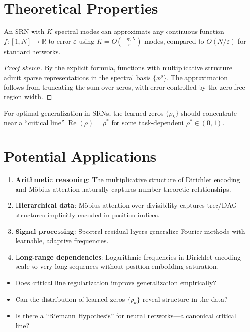 \section{Theoretical Properties}

\begin{theorem}
  An SRN with $K$ spectral modes can approximate any continuous function $f: [1, N] \to \mathbb{R}$ to error $\varepsilon$ using $K = O\left(\frac{\log N}{\varepsilon}\right)$ modes, compared to $O(N/\varepsilon)$ for standard networks.
\end{theorem}

\begin{proof}[Proof sketch]
  By the explicit formula, functions with multiplicative structure admit sparse representations in the spectral basis $\{x^\rho\}$. The approximation follows from truncating the sum over zeros, with error controlled by the zero-free region width.
\end{proof}

\begin{conjecture}
  For optimal generalization in SRNs, the learned zeros $\{\rho_k\}$ should concentrate near a ``critical line'' $\operatorname{Re}(\rho) = \rho^*$ for some task-dependent $\rho^* \in (0, 1)$.
\end{conjecture}

\section{Potential Applications}

\begin{enumerate}
  \item \textbf{Arithmetic reasoning}: The multiplicative structure of Dirichlet encoding and M\"obius attention naturally captures number-theoretic relationships.

  \item \textbf{Hierarchical data}: M\"obius attention over divisibility captures tree/DAG structures implicitly encoded in position indices.

  \item \textbf{Signal processing}: Spectral residual layers generalize Fourier methods with learnable, adaptive frequencies.

  \item \textbf{Long-range dependencies}: Logarithmic frequencies in Dirichlet encoding scale to very long sequences without position embedding saturation.
\end{enumerate}

\begin{remark}
  \begin{itemize}
    \item Does critical line regularization improve generalization empirically?
    \item Can the distribution of learned zeros $\{\rho_k\}$ reveal structure in the data?
    \item Is there a ``Riemann Hypothesis'' for neural networks---a canonical critical line?
  \end{itemize}
\end{remark}
